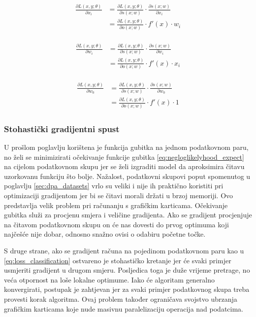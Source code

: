 \documentclass[times, utf8, numeric, diplomski]{fer}
\def\pfrac#1#2{\frac{\partial #1}{\partial #2}}
\begin{document}
\begin{align}
\begin{split}
\pfrac{L(x,y;\theta)}{x_i} &= \pfrac{L(x,y;\theta)}{s(x;w)} \cdot \pfrac{s(x;w)}{x_i} \\
&= \pfrac{L(x,y;\theta)}{o(x;w)} \cdot f'(x) \cdot w_i
\end{split}
\end{align}

\begin{align} \label{eq:w_update}
\begin{split}
\pfrac{L(x,y;\theta)}{w_i} &= \pfrac{L(x,y;\theta)}{s(x;w)} \cdot \pfrac{s(x;w)}{w_i} \\
&= \pfrac{L(x,y;\theta)}{o(x;w)} \cdot f'(x) \cdot x_i
\end{split}
\end{align}

\begin{align}
\begin{split}
\pfrac{L(x,y;\theta)}{w_0} &= \pfrac{L(x,y;\theta)}{s(x;w)} \cdot \pfrac{s(x;w)}{w_0} \\
&= \pfrac{L(x,y;\theta)}{o(x;w)} \cdot f'(x) \cdot 1
\end{split}
\end{align}

\subsubsection{Stohastički gradijentni spust}
U prošlom poglavlju korištena je funkcija gubitka na jednom podatkovnom paru, no želi se minimizirati očekivanje funkcije gubitka \eqref{eq:negloglikelyhood_expect} na cijelom podatkovnom skupu jer se želi izgraditi model da aproksimira čitavu uzorkovanu funkciju što bolje. Nažalost, podatkovni skupovi poput spomenutog u poglavlju \ref{sec:dpa_datasets} vrlo su veliki i nije ih praktično koristiti pri optimizaciji gradijentom jer bi se čitavi morali držati u brzoj memoriji. Ovo predstavlja velik problem pri računanju s grafičkim karticama. Očekivanje gubitka služi za procjenu smjera i veličine gradijenta. Ako se gradijent procjenjuje na čitavom podatkovnom skupu on će nas dovesti do prvog optimuma koji najčešće nije dobar, odnosno snažno ovisi o odabiru početne točke. 

S druge strane, ako se gradijent računa na pojedinom podatkovnom paru kao u \eqref{eq:loss_classification} ostvareno je stohastičko kretanje jer će svaki primjer usmjeriti gradijent u drugom smjeru. Posljedica toga je duže vrijeme pretrage, no veća otpornost na loše lokalne optimume. Iako će algoritam generalno konvergirati, postupak je zahtjevan jer za svaki primjer podatkovnog skupa treba provesti korak algoritma. Ovaj problem također ograničava svojstvo ubrzanja grafičkim karticama koje nude masivnu paralelizaciju operacija nad podatcima.
\end{document}
